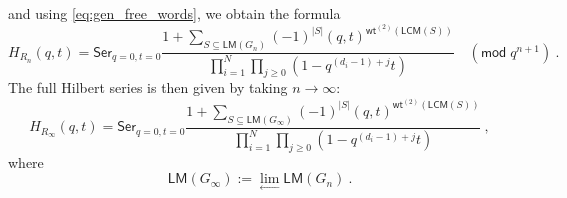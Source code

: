 \documentclass[a4paper,10pt]{article}
\newcommand{\mr}[1]{\mathsf{#1}}
\begin{document}
\begin{appendix}
\begin{equation}
\end{equation}
and using \eqref{eq:gen_free_words}, we obtain the formula 
\begin{equation}
\label{eq: hilbert_ser_Rn'}
H_{R_n}(q,t) = \mr{Ser}_{q=0,t=0}\frac{1+\sum_{S\subseteq \mr{LM}(G_n)}(-1)^{|S|}(q,t)^{\mr{wt}^{(2)}(\mr{LCM}(S))}}{\prod_{i=1}^N\prod_{j\geq 0}\left(1-q^{(d_i-1)+j}t\right)} \quad (\mr{mod} \;q^{n+1})~.
\end{equation}
The full Hilbert series is then given by taking $n\to \infty$:
\begin{equation}
\label{eq: hilbert_ser_Rinfty'}
H_{R_\infty}(q,t) = \mr{Ser}_{q=0,t=0}\frac{1+\sum_{S\subseteq \mr{LM}(G_\infty)}(-1)^{|S|}(q,t)^{\mr{wt}^{(2)}(\mr{LCM}(S))}}{\prod_{i=1}^N\prod_{j\geq 0}\left(1-q^{(d_i-1)+j}t\right)}~,
\end{equation}
where 
\begin{equation}
    \mr{LM}(G_\infty):=\lim _{\leftarrow } \mr{LM}(G_n)~.
\end{equation}

\end{appendix}
\end{document}
